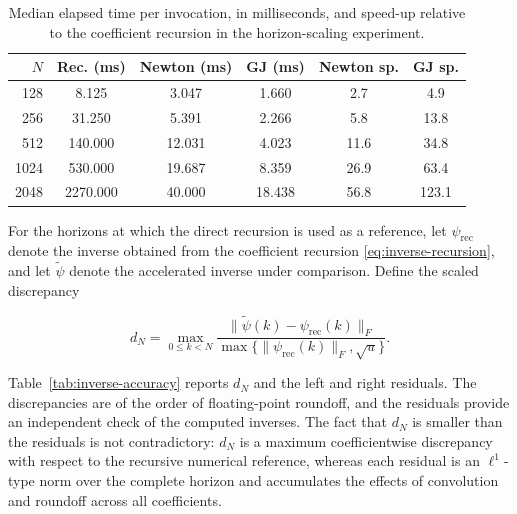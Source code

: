 \documentclass[3p,12pt,authoryear]{elsarticle}
\theoremstyle{definition}
\theoremstyle{remark}
\begin{document}
\begin{table}[H]
\centering
\small
\begin{tabular}{rccccc}
\toprule
$N$ & Rec. (ms) & Newton (ms) & GJ (ms) & Newton sp. & GJ sp.\\
\midrule
128  & 8.125    & 3.047  & 1.660  & 2.7  & 4.9\\
256  & 31.250   & 5.391  & 2.266  & 5.8  & 13.8\\
512  & 140.000  & 12.031 & 4.023  & 11.6 & 34.8\\
1024 & 530.000  & 19.687 & 8.359  & 26.9 & 63.4\\
2048 & 2270.000 & 40.000 & 18.438 & 56.8 & 123.1\\
\bottomrule
\end{tabular}
\caption{Median elapsed time per invocation, in milliseconds, and speed-up relative to the coefficient recursion in the horizon-scaling experiment.}
\label{tab:execution-times}
\end{table}

For the horizons at which the direct recursion is used as a reference, let $\psi_{\mathrm{rec}}$ denote the inverse obtained from the coefficient recursion \eqref{eq:inverse-recursion}, and let $\widetilde\psi$ denote the accelerated inverse under comparison. Define the scaled discrepancy

\begin{equation*}
d_N
=
\max_{0\leq k<N}
\frac{\|\widetilde\psi(k)-\psi_{\mathrm{rec}}(k)\|_F}
{\max\{\|\psi_{\mathrm{rec}}(k)\|_F,\sqrt{u}\}}.
\end{equation*}

Table~\ref{tab:inverse-accuracy} reports $d_N$ and the left and right residuals. The discrepancies are of the order of floating-point roundoff, and the residuals provide an independent check of the computed inverses. The fact that $d_N$ is smaller than the residuals is not contradictory: $d_N$ is a maximum coefficientwise discrepancy with respect to the recursive numerical reference, whereas each residual is an $\ell^1$-type norm over the complete horizon and accumulates the effects of convolution and roundoff across all coefficients.
\end{document}
